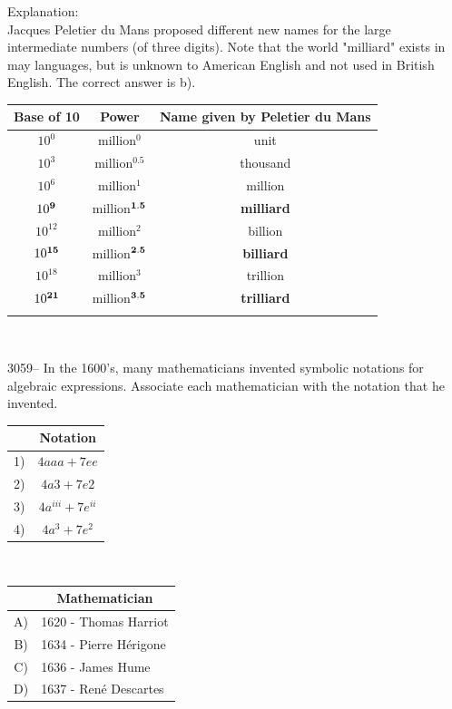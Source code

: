 \documentclass[letterpaper, 12pt]{article}
\begin{document}
Explanation:\\
Jacques Peletier du Mans proposed different new names for the large intermediate numbers (of three digits). Note that the world "milliard" exists in may languages, but is unknown to American English and not used in British English. The correct answer is b).
\begin{center}
\begin{tabular}{|c|c|c|} \hline
{\bf Base of 10} & {\bf Power} & {\bf Name given by Peletier du Mans} \\ \hline \hline
$10^{0}$ & million$^{0}$ & unit \\[1mm] \hline
$10^{3}$ & million$^{0.5}$ & thousand \\[1mm] \hline
$10^{6}$ & million$^{1}$ & million \\[1mm] \hline
$10^{\bf{9}}$ & million$^{\bf{1.5}}$ & \textbf{milliard} \\[1mm] \hline
$10^{12}$ & million$^{2}$ & billion \\[1mm] \hline
$10^{\bf{15}}$ & million$^{\bf{2.5}}$ & \textbf{billiard} \\[1mm] \hline
$10^{18}$ & million$^{3}$ & trillion \\[1mm] \hline
$10^{\bf{21}}$ & million$^{\bf{3.5}}$ & \textbf{trilliard} \\[1mm] \hline
\multicolumn{3}{c}{}\\
\end{tabular}\\
\end{center}



3059-- In the 1600's, many mathematicians invented symbolic notations for algebraic expressions. Associate each mathematician with the notation that he invented.\\
\begin{center}
\begin{tabular}{|c|c|} \cline{2-2}
\multicolumn{1}{c|}{} & \multicolumn{1}{|c|}{\bf Notation}\\ \hline
1) & $4aaa + 7ee$\\ \hline
2) & $4a3 + 7e2$\\ \hline
3) & $4a^{iii} + 7e^{ii}$\\ \hline
4) & $4a^{3} + 7e^{2}$\\ \hline
\end{tabular} \ \ \ \ \ \ \ \
\begin{tabular}{|c|l|} \cline{2-2}
\multicolumn{1}{c|}{} & \multicolumn{1}{|c|}{\bf Mathematician}\\ \hline
A) & 1620 - Thomas Harriot\\ \hline
B) & 1634 - Pierre H\'erigone\\ \hline
C) & 1636 - James Hume\\ \hline
D) & 1637 - Ren\'e Descartes\\ \hline
\end{tabular}
\end{center}
\end{document}
